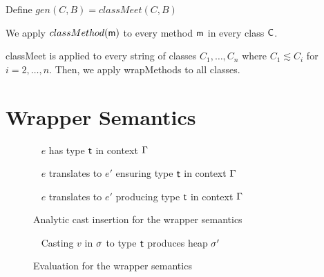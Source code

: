 \documentclass{sigplanconf}
\newcommand{\opdef}[2]{\framebox[1.1\width]{#1} ~ #2\\}
\begin{document}
Define $gen(C, B) = classMeet(C,B)$

We apply $classMethod(\m)$ to every method $\m$ in every class $\C$.

classMeet is applied to every string of classes $C_1,\ldots,C_n$ where $C_1 \lesssim C_i$ for $i=2,\ldots,n$. Then, we apply wrapMethods to all classes.

\section{Wrapper Semantics}


\begin{figure}
\opdef{$\Gamma\vdash e : \t$}{$e$ has type $\t$ in context $\G$}
\begin{mathpar}



\end{mathpar}
\opdef{$\CICAST{e}{\t}{e'}$}{$e$ translates to $e'$ ensuring type $\t$ in context $\G$}
\begin{mathpar}
\end{mathpar}
\opdef{$\CICAST{e}{\t}{e'}$}{$e$ translates to $e'$ producing type $\t$ in context $\G$}
\begin{mathpar}

\end{mathpar}
\caption{Analytic cast insertion for the wrapper semantics}
\end{figure}


\begin{figure}
\opdef{$\sigma' = \text{cast}(\s, v, \t)$}{Casting $v$ in $\s$ to type $\t$ produces heap $\s'$}
\begin{mathpar}
\end{mathpar}
\caption{Evaluation for the wrapper semantics}
\end{figure}
\end{document}
